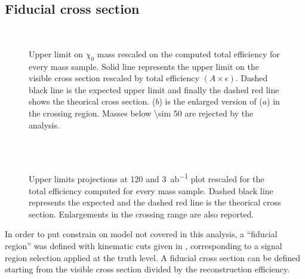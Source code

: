 

\subsection{Fiducial cross section}



\begin{figure}[p]
\centering
{} \\
 \quad
\caption{Upper limit on $\chi_0$ mass rescaled on the computed total efficiency for every mass sample. Solid line represents the upper limit on the visible cross section rescaled by total efficiency $\left(A\times\epsilon\right)$. Dashed black line is the expected upper limit and finally the dashed red line shows the theorical cross section. ($b$) is the enlarged version of ($a$) in the crossing region. Masses below \SI{\sim 50}{\gev} are rejected by the analysis.}
\label{fig:exclMI}
\end{figure}

\begin{figure}[p]
\centering
{} \quad
{} \\
 \quad
{} \\
\caption{Upper limits projections at \SI{120}{\ifb} and \SI{3}{ab^{-1}} plot rescaled for the total efficiency computed for every mass sample. Dashed black line represents the expected and the dashed red line is the theorical cross section. Enlargements in the crossing range are also reported.}
\label{fig:outlookmi}
\end{figure}

In order to put constrain on model not covered in this analysis, a ``fiducial region'' was defined with kinematic cuts given in \Sect{\ref{sec:truth}}, corresponding to a signal region selection applied at the truth level. A fiducial cross section can be defined starting from the visible cross section divided by the reconstruction efficiency.

